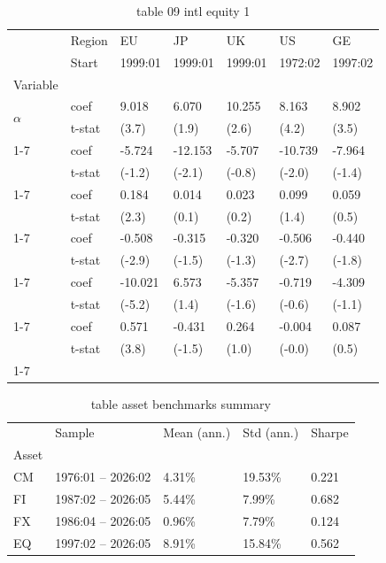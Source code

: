 \documentclass{article}
\begin{document}
\begin{table}[htbp]
  \centering
  \caption{table 09 intl equity 1}
  \label{tab:table_09_intl_equity_1}
  \begin{tabular}{lllllll}
\toprule
 & Region & EU & JP & UK & US & GE \\
 & Start & 1999:01 & 1999:01 & 1999:01 & 1972:02 & 1997:02 \\
Variable &  &  &  &  &  &  \\
\midrule
\multirow[t]{2}{*}{$\alpha$} & coef & 9.018 & 6.070 & 10.255 & 8.163 & 8.902 \\
 & t-stat & (3.7) & (1.9) & (2.6) & (4.2) & (3.5) \\
\cline{1-7}
\multirow[t]{2}{*}{$I_{B\sigma^2}$} & coef & -5.724 & -12.153 & -5.707 & -10.739 & -7.964 \\
 & t-stat & (-1.2) & (-2.1) & (-0.8) & (-2.0) & (-1.4) \\
\cline{1-7}
\multirow[t]{2}{*}{$R^e_m$} & coef & 0.184 & 0.014 & 0.023 & 0.099 & 0.059 \\
 & t-stat & (2.3) & (0.1) & (0.2) & (1.4) & (0.5) \\
\cline{1-7}
\multirow[t]{2}{*}{$I_B R^e_m$} & coef & -0.508 & -0.315 & -0.320 & -0.506 & -0.440 \\
 & t-stat & (-2.9) & (-1.5) & (-1.3) & (-2.7) & (-1.8) \\
\cline{1-7}
\multirow[t]{2}{*}{$\hat{\sigma}^2_m R^e_m$} & coef & -10.021 & 6.573 & -5.357 & -0.719 & -4.309 \\
 & t-stat & (-5.2) & (1.4) & (-1.6) & (-0.6) & (-1.1) \\
\cline{1-7}
\multirow[t]{2}{*}{$I_{B\sigma^2} R^e_m$} & coef & 0.571 & -0.431 & 0.264 & -0.004 & 0.087 \\
 & t-stat & (3.8) & (-1.5) & (1.0) & (-0.0) & (0.5) \\
\cline{1-7}
\bottomrule
\end{tabular}
\end{table}

\begin{table}[htbp]
  \centering
  \caption{table asset benchmarks summary}
  \label{tab:table_asset_benchmarks_summary}
  \begin{tabular}{lllll}
\toprule
 & Sample & Mean (ann.) & Std (ann.) & Sharpe \\
Asset &  &  &  &  \\
\midrule
CM & 1976:01 -- 2026:02 & 4.31\% & 19.53\% & 0.221 \\
FI & 1987:02 -- 2026:05 & 5.44\% & 7.99\% & 0.682 \\
FX & 1986:04 -- 2026:05 & 0.96\% & 7.79\% & 0.124 \\
EQ & 1997:02 -- 2026:05 & 8.91\% & 15.84\% & 0.562 \\
\bottomrule
\end{tabular}
\end{table}
\end{document}
